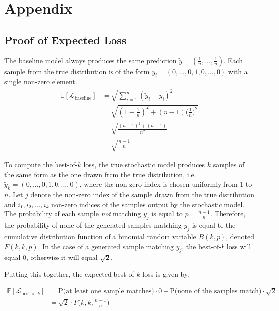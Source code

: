 \documentclass{article}
\begin{document}
\section{Appendix}







\subsection{Proof of Expected Loss}

The baseline model always produces the same prediction $\tilde{y} = (\frac{1}{n}, ..., \frac{1}{n})$. Each sample from the true distribution is of the form $y_i = (0, ..., 0, 1, 0, ..., 0)$ with a single non-zero element.
\begin{align}
  \mathbb{E}[\mathcal{L}_{\mbox{baseline}}] &= \sqrt{\sum_{i=1}^n (\tilde{y}_i - y_i)^2} \\
  &= \sqrt{(1-\frac{1}{n})^2 + (n-1)\Big ( \frac{1}{n} \Big )^2} \\
  &= \sqrt{\frac{(n-1)^2 + (n-1)}{n^2}} \\
  &= \sqrt{\frac{n-1}{n}}
\end{align}

To compute the best-of-$k$ loss, the true stochastic model produces $k$ samples of the same form as the one drawn from the true distribution, i.e. $\tilde{y}_k = (0, ..., 0, 1, 0, ..., 0)$, where the non-zero index is chosen uniformly from $1$ to $n$.
Let $j$ denote the non-zero index of the sample drawn from the true distribution and $i_1, i_2, ..., i_k$ non-zero indices of the samples output by the stochastic model.
The probability of each sample \textit{not} matching $y_j$ is equal to $p=\frac{n-1}{n}$.
Therefore, the probability of none of the generated samples matching $y_j$ is equal to the cumulative distribution function of a binomial random variable $B(k, p)$, denoted $F(k, k, p)$.
In the case of a generated sample matching $y_j$, the best-of-$k$ loss will equal 0, otherwise it will equal $\sqrt{2}$.

Putting this together, the expected best-of-$k$ loss is given by:

\begin{align}
  \mathbb{E}[\mathcal{L}_{\mbox{best-of-$k$}}] &= \mbox{P(at least one sample matches)}\cdot 0 + \mbox{P(none of the samples match)} \cdot \sqrt{2} \\
  &= \sqrt{2} \cdot F\Big (k, k, \frac{n-1}{n} \Big) \\
\end{align}
\end{document}
